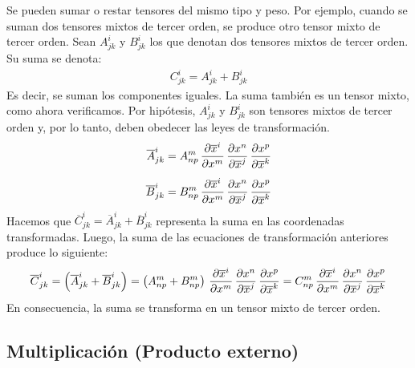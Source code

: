 \documentclass[hidelinks,12pt]{article}
\begin{document}
Se pueden sumar o restar tensores del mismo tipo y peso. Por ejemplo, cuando se suman dos tensores mixtos de tercer orden, se produce otro tensor mixto de tercer orden. Sean $A_{jk}^{i}$ y $B_{jk}^{i}$ los que denotan dos tensores mixtos de tercer orden. Su suma se denota:
\begin{align*}
C_{jk}^{i} = A_{jk}^{i} +B_{jk}^{i}
\end{align*}
Es decir, se suman los componentes iguales. La suma también es un tensor mixto, como ahora verificamos. Por hipótesis, $A_{jk}^{i}$ y $B_{jk}^{i}$ son tensores mixtos de tercer orden y, por lo tanto, deben obedecer las leyes de transformación.
\begin{align*}
\overline{A}_{jk}^{i} &= A_{np}^{m} \, \pdv{\overline{x}^{i}}{x^{m}} \, \pdv{x^{n}}{\overline{x}^{j}} \, \pdv{x^{p}}{\overline{x}^{k}} \\[0.5em]
\overline{B}_{jk}^{i} &= B_{np}^{m} \, \pdv{\overline{x}^{i}}{x^{m}} \, \pdv{x^{n}}{\overline{x}^{j}} \, \pdv{x^{p}}{\overline{x}^{k}}
\end{align*}
Hacemos que $\overline{C}_{jk}^{i} = \overline{A}_{jk}^{i} + \overline{B}_{jk}^{i}$ representa la suma en las coordenadas transformadas. Luego, la suma de las ecuaciones de transformación anteriores produce lo siguiente:
\begin{align*}
\overline{C}_{jk}^{i} = \left( \overline{A}_{jk}^{i} + \overline{B}_{jk}^{i} \right) = \left( A_{np}^{m} + B_{np}^{m} \right) \, \pdv{\overline{x}^{i}}{x^{m}} \, \pdv{x^{n}}{\overline{x}^{j}} \, \pdv{x^{p}}{\overline{x}^{k}} = C_{np}^{m} \, \pdv{\overline{x}^{i}}{x^{m}} \, \pdv{x^{n}}{\overline{x}^{j}} \, \pdv{x^{p}}{\overline{x}^{k}}
\end{align*}
En consecuencia, la suma se transforma en un tensor mixto de tercer orden.

\subsection{Multiplicación (Producto externo)}
\end{document}
